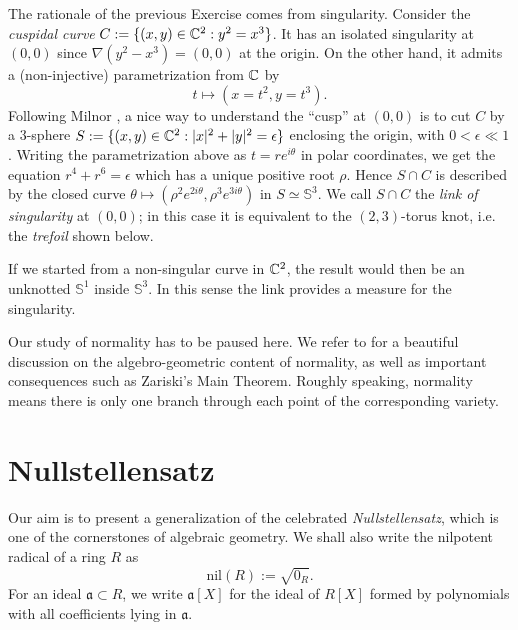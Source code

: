 \begin{remark}
	The rationale of the previous Exercise comes from singularity. Consider the \emph{cuspidal curve} $C := \{ (x,y) \in \mathbb{C}^2: y^2=x^3\}$. It has an isolated singularity at $(0,0)$ since $\nabla (y^2-x^3) = (0,0)$ at the origin. On the other hand, it admits a (non-injective) parametrization from $\mathbb{C}$ by
	\[ t \mapsto (x=t^2, y=t^3). \]
	Following Milnor \cite{Mil68}, a nice way to understand the ``cusp'' at $(0,0)$ is to cut $C$ by a $3$-sphere $S := \{(x,y) \in \mathbb{C}^2: |x|^2 + |y|^2 = \epsilon \}$ enclosing the origin, with $0 < \epsilon \ll 1$. Writing the parametrization above as $t=re^{i\theta}$ in polar coordinates, we get the equation $r^4 + r^6 = \epsilon$ which has a unique positive root $\rho$. Hence $S \cap C$ is described by the closed curve $\theta \mapsto (\rho^2 e^{2i\theta}, \rho^3 e^{3i\theta})$ in $S \simeq \mathbb{S}^3$. We call $S \cap C$ the \emph{link of singularity} at $(0,0)$; in this case it is equivalent to the $(2,3)$-torus knot, i.e. the \emph{trefoil} shown below.
	
	\begin{center}\vspace{1.5em}
	\end{center}

	If we started from a non-singular curve in $\mathbb{C}^2$, the result would then be an unknotted $\mathbb{S}^1$ inside $\mathbb{S}^3$. In this sense the link provides a measure for the singularity.
\end{remark}


Our study of normality has to be paused here. We refer to \cite[\S\S 8--9]{Mum99} for a beautiful discussion on the algebro-geometric content of normality, as well as important consequences such as Zariski's Main Theorem. Roughly speaking, normality means there is only one branch through each point of the corresponding variety.

\section{Nullstellensatz}
Our aim is to present a generalization of the celebrated \emph{Nullstellensatz}, which is one of the cornerstones of algebraic geometry. We shall also write the nilpotent radical of a ring $R$ as
\[ \text{nil}(R) := \sqrt{0_R}. \]
For an ideal $\mathfrak{a} \subset R$, we write $\mathfrak{a}[X]$ for the ideal of $R[X]$ formed by polynomials with all coefficients lying in $\mathfrak{a}$.

